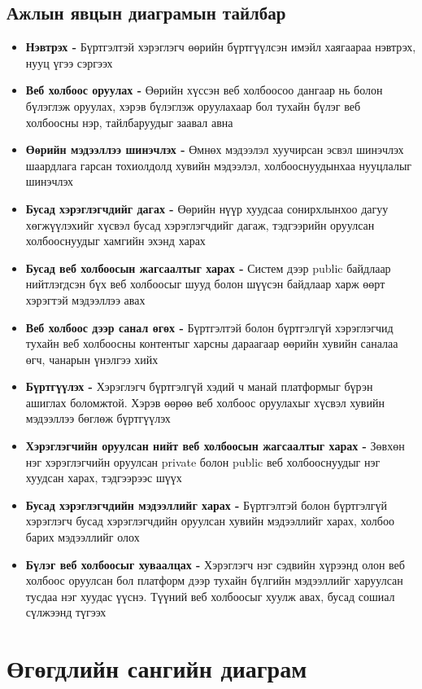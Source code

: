 \subsection{Ажлын явцын диаграмын тайлбар}

\begin{itemize}
	\item \textbf{Нэвтрэх -} Бүртгэлтэй хэрэглэгч өөрийн бүртгүүлсэн имэйл хаягаараа нэвтрэх, нууц үгээ сэргээх
	\item \textbf{Веб холбоос оруулах -} Өөрийн хүссэн веб холбоосоо дангаар нь болон бүлэглэж оруулах, хэрэв бүлэглэж оруулахаар бол тухайн бүлэг веб холбоосны нэр, тайлбаруудыг заавал авна
	\item \textbf{Өөрийн мэдээллээ шинэчлэх -} Өмнөх мэдээлэл хуучирсан эсвэл шинэчлэх шаардлага гарсан тохиолдолд хувийн мэдээлэл, холбооснуудынхаа нууцлалыг шинэчлэх
	\item \textbf{Бусад хэрэглэгчдийг дагах -} Өөрийн нүүр хуудсаа сонирхлынхоо дагуу хөгжүүлэхийг хүсвэл бусад хэрэглэгчдийг дагаж, тэдгээрийн оруулсан холбооснуудыг хамгийн эхэнд харах
	\item \textbf{Бусад веб холбоосын жагсаалтыг харах -} Систем дээр public байдлаар нийтлэгдсэн бүх веб холбоосыг шууд болон шүүсэн байдлаар харж өөрт хэрэгтэй мэдээллээ авах
	\item \textbf{Веб холбоос дээр санал өгөх -} Бүртгэлтэй болон бүртгэлгүй хэрэглэгчид тухайн веб холбоосны контентыг харсны дараагаар өөрийн хувийн саналаа өгч, чанарын үнэлгээ хийх 
	\item \textbf{Бүртгүүлэх -} Хэрэглэгч бүртгэлгүй хэдий ч манай платформыг бүрэн ашиглах боломжтой. Хэрэв өөрөө веб холбоос оруулахыг хүсвэл хувийн мэдээллээ бөглөж бүртгүүлэх
	\item \textbf{Хэрэглэгчийн оруулсан нийт веб холбоосын жагсаалтыг харах -} Зөвхөн нэг хэрэглэгчийн оруулсан private болон public веб холбооснуудыг нэг хуудсан харах, тэдгээрээс шүүх
	\item \textbf{Бусад хэрэглэгчдийн мэдээллийг харах -} Бүртгэлтэй болон бүртгэлгүй хэрэглэгч бусад хэрэглэгчдийн оруулсан хувийн мэдээллийг харах, холбоо барих мэдээллийг олох
	\item \textbf{Бүлэг веб холбоосыг хуваалцах -} Хэрэглэгч нэг сэдвийн хүрээнд олон веб холбоос оруулсан бол платформ дээр тухайн бүлгийн мэдээллийг харуулсан тусдаа нэг хуудас үүснэ. Түүний веб холбоосыг хуулж авах, бусад сошиал сүлжээнд түгээх
\end{itemize}

\pagebreak
\section{Өгөгдлийн сангийн диаграм}

